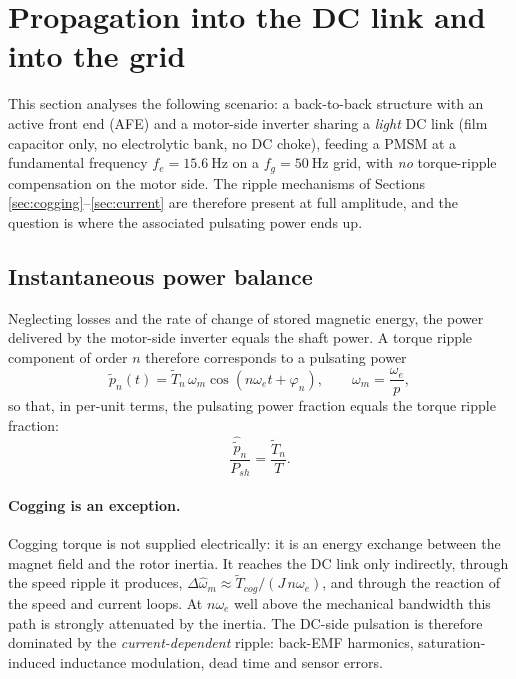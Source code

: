 \documentclass[11pt,a4paper]{article}
\begin{document}
\section{Propagation into the DC link and into the grid}
\label{sec:grid}

This section analyses the following scenario: a back-to-back structure with an
active front end (AFE) and a motor-side inverter sharing a \emph{light} DC link
(film capacitor only, no electrolytic bank, no DC choke), feeding a PMSM at a
fundamental frequency $f_{e}=\SI{15.6}{\hertz}$ on a $f_{g}=\SI{50}{\hertz}$
grid, with \emph{no} torque-ripple compensation on the motor side. The ripple
mechanisms of Sections \ref{sec:cogging}--\ref{sec:current} are therefore
present at full amplitude, and the question is where the associated pulsating
power ends up.

\subsection{Instantaneous power balance}

Neglecting losses and the rate of change of stored magnetic energy, the power
delivered by the motor-side inverter equals the shaft power. A torque ripple
component of order $n$ therefore corresponds to a pulsating power
\begin{equation}
\tilde{p}_{n}(t) = \tilde{T}_{n}\,\omega_{m}\cos(n\omega_{e}t+\varphi_{n}),
\qquad \omega_{m}=\frac{\omega_{e}}{p},
\label{eq:pripple}
\end{equation}
so that, in per-unit terms, the pulsating power fraction equals the torque
ripple fraction:
\begin{equation}
\frac{\hat{\tilde{p}}_{n}}{P_{sh}}=\frac{\tilde{T}_{n}}{T} .
\end{equation}

\paragraph{Cogging is an exception.} Cogging torque is not supplied
electrically: it is an energy exchange between the magnet field and the rotor
inertia. It reaches the DC link only indirectly, through the speed ripple it
produces, $\Delta\hat{\omega}_{m}\approx \tilde{T}_{cog}/(J\,n\omega_{e})$, and
through the reaction of the speed and current loops. At $n\omega_{e}$ well above
the mechanical bandwidth this path is strongly attenuated by the inertia. The
DC-side pulsation is therefore dominated by the \emph{current-dependent} ripple:
back-EMF harmonics, saturation-induced inductance modulation, dead time and
sensor errors.
\end{document}
